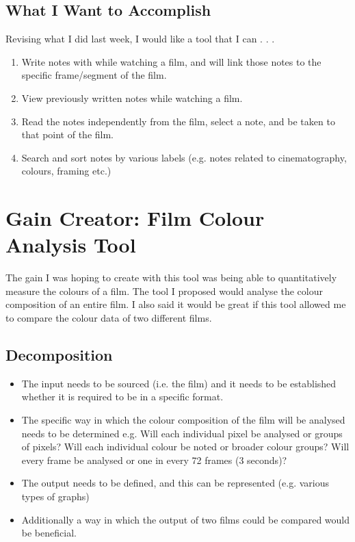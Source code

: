 \documentclass{article}
\begin{document}
\subsection*{What I Want to Accomplish}
Revising what I did last week, I would like a tool that I can . . .
\begin{enumerate}
\item Write notes with while watching a film, and will link those notes to the specific frame/segment of the film.
\item View previously written notes while watching a film.
\item Read the notes independently from the film, select a note, and be taken to that point of the film.
\item Search and sort notes by various labels (e.g. notes related to cinematography, colours, framing etc.)
\end{enumerate}

\pagebreak

\section{Gain Creator: Film Colour Analysis Tool}
The gain I was hoping to create with this tool was being able to quantitatively measure the colours of a film. The tool I proposed would analyse the colour composition of an entire film. I also said it would be great if this tool allowed me to compare the colour data of two different films.

\subsection*{Decomposition}
\begin{itemize}
\item The input needs to be sourced (i.e. the film) and it needs to be established whether it is required to be in a specific format.
\item The specific way in which the colour composition of the film will be analysed needs to be determined e.g. Will each individual pixel be analysed or groups of pixels? Will each individual colour be noted or broader colour groups? Will every frame be analysed or one in every 72 frames (3 seconds)?
\item The output needs to be defined, and this can be represented (e.g. various types of graphs)
\item Additionally a way in which the output of two films could be compared would be beneficial.
\end{itemize}
\end{document}
